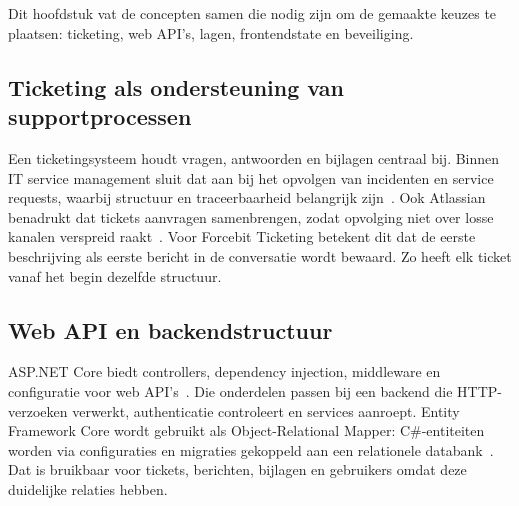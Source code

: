 \chapter{}%
\label{ch:stand-van-zaken}

%
%
%

Dit hoofdstuk vat de concepten samen die nodig zijn om de gemaakte keuzes te plaatsen: ticketing, web API's, lagen, frontendstate en beveiliging.

\section{Ticketing als ondersteuning van supportprocessen}

Een ticketingsysteem houdt vragen, antwoorden en bijlagen centraal bij. Binnen IT service management sluit dat aan bij het opvolgen van incidenten en service requests, waarbij structuur en traceerbaarheid belangrijk zijn~\autocite{Axelos2019ITIL4Foundation,ISOIEC20000One2018}. Ook Atlassian benadrukt dat tickets aanvragen samenbrengen, zodat opvolging niet over losse kanalen verspreid raakt~\autocite{AtlassianTicketingSystem2026}. Voor Forcebit Ticketing betekent dit dat de eerste beschrijving als eerste bericht in de conversatie wordt bewaard. Zo heeft elk ticket vanaf het begin dezelfde structuur.

\section{Web API en backendstructuur}

ASP.NET Core biedt controllers, dependency injection, middleware en configuratie voor web API's~\autocite{MicrosoftASPNetCore2026}. Die onderdelen passen bij een backend die HTTP-verzoeken verwerkt, authenticatie controleert en services aanroept. Entity Framework Core wordt gebruikt als Object-Relational Mapper: C\#-entiteiten worden via configuraties en migraties gekoppeld aan een relationele databank~\autocite{MicrosoftEFCore2026}. Dat is bruikbaar voor tickets, berichten, bijlagen en gebruikers omdat deze duidelijke relaties hebben.

